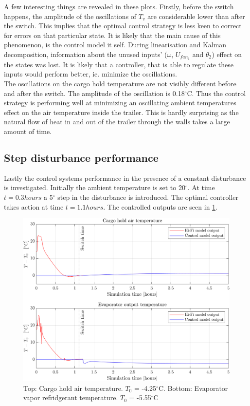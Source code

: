 A few interesting things are revealed in these plots. Firstly, before the switch happens, the amplitude of the oscillations of $T_v$ are considerable lower than after the switch. This implies that the optimal control strategy is less keen to correct for errors on that particular state. It is likely that the main cause of this phenomenon, is the control model it self. During linearisation and Kalman decomposition, information about the unused inputs' ($\omega$, $U_{fan_1}$ and $\theta_2$) effect on the states was lost. It is likely that a controller, that is able to regulate these inputs would perform better, ie. minimize the oscillations.\\

The oscillations on the cargo hold temperature are not visibly different before and after the switch. The amplitude of the oscillation is 0.18$^{\circ}$C. Thus the control strategy is performing well at minimizing an oscillating ambient temperatures effect on the air temperature inside the trailer. This is hardly surprising as the natural flow of heat in and out of the trailer through the walls takes a large amount of time. \\


\newpage
\subsection{Step disturbance performance}
Lastly the control systems performance in the presence of a constant disturbance is investigated. Initially the ambient temperature is set to 20$^{\circ}$. At time $t=0.3 hours$ a 5$^{\circ}$ step in the disturbance is introduced. The optimal controller takes action at time $t=1.1 hours$. The controlled outputs are seen in \cref{fig:LQR_wellTuned_5stepDist}.\\

\begin{figure}[h!]
	\centering
	\includegraphics[width=1\textwidth]{Graphics/fig_LQR_wellTuned_5stepDist.png}
	\caption{Top: Cargo hold air temperature. $T_0$ = -4.25$^{\circ}$C. Bottom: Evaporator vapor refridgerant temperature. $T_0$ = -5.55$^{\circ}$C}
	\label{fig:LQR_wellTuned_5stepDist}
\end{figure}

